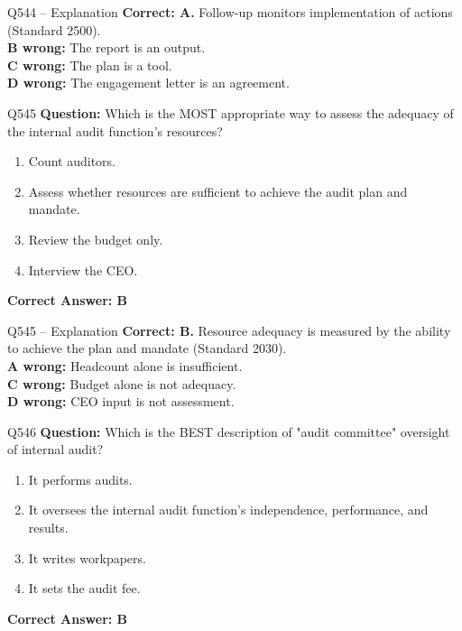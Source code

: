 \documentclass[aspectratio=169,10pt]{beamer}
\begin{document}
	\begin{frame}[t]{Q544 -- Explanation}
		\small
		\textbf{Correct: A.} Follow-up monitors implementation of actions (Standard 2500). \\[4pt]
		\textbf{B wrong:} The report is an output. \\[2pt]
		\textbf{C wrong:} The plan is a tool. \\[2pt]
		\textbf{D wrong:} The engagement letter is an agreement.
	\end{frame}
	
	\begin{frame}[t]{Q545}
		\small
		\textbf{Question:} Which is the MOST appropriate way to assess the adequacy of the internal audit function's resources?
		\begin{enumerate}[label=\Alph*.,itemsep=1pt,topsep=2pt]
			\item Count auditors.
			\item Assess whether resources are sufficient to achieve the audit plan and mandate.
			\item Review the budget only.
			\item Interview the CEO.
		\end{enumerate}
		\vspace{4pt}
		\textbf{Correct Answer: B}
	\end{frame}
	
	\begin{frame}[t]{Q545 -- Explanation}
		\small
		\textbf{Correct: B.} Resource adequacy is measured by the ability to achieve the plan and mandate (Standard 2030). \\[4pt]
		\textbf{A wrong:} Headcount alone is insufficient. \\[2pt]
		\textbf{C wrong:} Budget alone is not adequacy. \\[2pt]
		\textbf{D wrong:} CEO input is not assessment.
	\end{frame}
	
	\begin{frame}[t]{Q546}
		\small
		\textbf{Question:} Which is the BEST description of "audit committee" oversight of internal audit?
		\begin{enumerate}[label=\Alph*.,itemsep=1pt,topsep=2pt]
			\item It performs audits.
			\item It oversees the internal audit function's independence, performance, and results.
			\item It writes workpapers.
			\item It sets the audit fee.
		\end{enumerate}
		\vspace{4pt}
		\textbf{Correct Answer: B}
	\end{frame}
	
\end{document}
